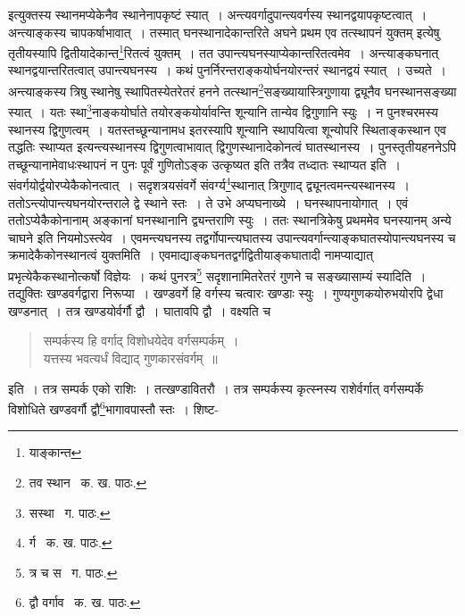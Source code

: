 \documentclass[11pt, openany]{book}
\begin{document}
\newpage

\noindent इत्युक्तस्य स्थानमप्येकेनैव स्थानेनापकृष्टं स्यात्~। अन्त्यवर्गादुपान्त्यवर्गस्य स्थानद्वयापकृष्टत्वात्~। अन्त्याङ्कस्य चापकर्षाभावात्~। तस्मात् घनस्थानादेकान्तरिते अघने प्रथम एव तत्स्थापनं युक्तम् इत्येषु तृतीयस्यापि द्वितीयादेकान्त\renewcommand{\thefootnote}{१}\footnote{याङ्कान्त}रितत्वं युक्तम्~। तत उपान्त्यघनस्याप्येकान्तरितत्वमेव~। अन्त्याङ्कघनात् स्थानद्वयान्तरितत्वात् उपान्त्यघनस्य~। कथं पुनर्निरन्तराङ्कयोर्घनयोरन्तरं स्थानद्वयं स्यात्~। उच्यते~। अन्त्याङ्कस्य त्रिषु स्थानेषु स्थापितस्येतरेतरं हनने तत्स्थान\renewcommand{\thefootnote}{२}\footnote{तव स्थान \textendash\ क. ख. पाठः.}सङ्ख्यायास्त्रिगुणाया द्व्यूनैव घनस्थानसङ्ख्या स्यात्~। 
यतः स्था\renewcommand{\thefootnote}{३}\footnote{सस्था \textendash\ ग. पाठः.}नाङ्कयोर्घाते तयोरङ्कयोर्यावन्ति शून्यानि तान्येव द्विगुणानि स्युः~। न पुनश्चरमस्य स्थानस्य द्विगुणत्वम्~। यतस्तच्छून्यानामध इतरस्यापि
शून्यानि स्थापयित्वा शून्योपरि स्थिताङ्कस्थान एव तद्धतिः स्थाप्यत इत्यन्त्यस्थानस्य द्विगुणत्वाभावात् द्विगुणस्थानादेकोनत्वं घातस्थानस्य~।
पुनस्तृतीयहननेऽपि तच्छून्यानामेवाधःस्थापनं न पुनः पूर्वं गुणितोऽङ्क उत्कृष्यत इति तत्रैव तध्दातः स्थाप्यत इति~। संवर्गयोर्द्वयोरप्येकैकोनत्वात्~। सदृशत्रयसंवर्गे संवर्ग्य\renewcommand{\thefootnote}{४}\footnote{र्ग \textendash\ क. ख. पाठः.}स्थानात् त्रिगुणाद् द्व्यूनत्वमन्त्यस्थानस्य~। ततोऽन्त्योपान्त्यघनयोरन्तराले द्वे स्थाने स्तः~। ते उभे अप्यघनाख्ये~। घनस्थापनायोगात्~। एवं ततोऽप्येकैकोनानाम् अङ्कानां घनस्थानानि द्व्यन्तराणि स्युः~। ततः स्थानत्रिकेषु प्रथममेव घनस्यानम् अन्ये चाघने इति नियमोऽस्त्येव~। एवमन्त्यघनस्य तद्वर्गोपान्त्यघातस्य उपान्त्यवर्गान्त्याङ्कघातस्योपान्त्यघनस्य च क्रमादेकैकोनस्थानत्वं युक्तमिति~। एवमाद्याङ्कघनतद्वर्गद्वितीयाङ्कघातादी नामप्याद्यात् प्रभृत्येकैकस्थानोत्कर्षो विज्ञेयः~। कथं पुनरत्र\renewcommand{\thefootnote}{५}\footnote{त्र च स \textendash\ ग. पाठः.} सदृशानामितरेतरं गुणने च सङ्ख्यासाम्यं स्यादिति~। तद्युक्तिः खण्डवर्गद्वारा निरूप्या~। खण्डवर्गे हि वर्गस्य चत्वारः खण्डाः स्युः~। गुण्यगुणकयोरुभयोरपि द्वेधा खण्डनात्~। तत्र खण्डयोर्वर्गौ द्वौ~। घातावपि द्वौ~। वक्ष्यति च\textendash 

\begin{quote}
{\qt सम्पर्कस्य हि वर्गाद् विशोधयेदेव वर्गसम्पर्कम्~।\\
यत्तस्य भवत्यर्धं विद्याद् गुणकारसंवर्गम्~॥}
\end{quote}

\noindent इति~। तत्र सम्पर्क एको राशिः~। तत्खण्डावितरौ~। तत्र सम्पर्कस्य कृत्स्नस्य राशेर्वर्गात् वर्गसम्पर्के विशोधिते खण्डवर्गौ द्वौ\renewcommand{\thefootnote}{६}\footnote{द्वौ वर्गाव \textendash\ क. ख. पाठः.}भागावपास्तौ स्तः~। शिष्ट-
\end{document}
